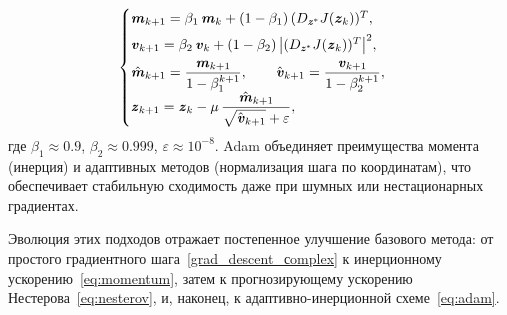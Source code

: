 \begin{equation}
	\begin{cases}
		\textbf{\textit{m}}_{k+1} = \beta_1\,\textbf{\textit{m}}_k + (1-\beta_1)\,(D_{\textbf{\textit{z}}^*}J(\textbf{\textit{z}}_k))^T,\\[4pt]
		\textbf{\textit{v}}_{k+1} = \beta_2\,\textbf{\textit{v}}_k + (1-\beta_2)\,\bigl|(D_{\textbf{\textit{z}}^*}J(\textbf{\textit{z}}_k))^T\bigr|^2,\\[4pt]
		\hat{\textbf{\textit{m}}}_{k+1} = \dfrac{\textbf{\textit{m}}_{k+1}}{1 - \beta_1^{k+1}},\qquad
		\hat{\textbf{\textit{v}}}_{k+1} = \dfrac{\textbf{\textit{v}}_{k+1}}{1 - \beta_2^{k+1}},\\[6pt]
		\textbf{\textit{z}}_{k+1} = \textbf{\textit{z}}_k - \mu\,\dfrac{\hat{\textbf{\textit{m}}}_{k+1}}{\sqrt{\hat{\textbf{\textit{v}}}_{k+1}} + \varepsilon},
	\end{cases}
	\label{eq:adam}
\end{equation}
где \(\beta_1 \approx 0.9\), \(\beta_2 \approx 0.999\), \(\varepsilon \approx 10^{-8}\).  
Adam объединяет преимущества момента (инерция) и адаптивных методов (нормализация шага по координатам), что обеспечивает стабильную сходимость даже при шумных или нестационарных градиентах.

Эволюция этих подходов отражает постепенное улучшение базового метода: от простого градиентного шага~\eqref{grad_descent_сomplex} к инерционному ускорению~\eqref{eq:momentum}, затем к прогнозирующему ускорению Нестерова~\eqref{eq:nesterov}, и, наконец, к адаптивно-инерционной схеме~\eqref{eq:adam}.